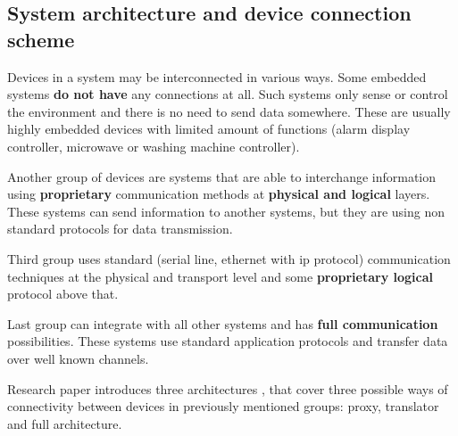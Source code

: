 \subsection{System architecture and  device connection scheme}
\label{sec:device_connection_scheme}
Devices in a system may be interconnected in various ways.
Some embedded systems \textbf{do not have} any connections at all. 
Such systems only sense or control the environment and there is no need to
send data somewhere. These are usually highly embedded devices with limited
amount of functions (alarm display controller, microwave or washing machine
controller).

Another group of devices are systems that are able to interchange
information using \textbf{proprietary} communication methods at \textbf{physical
and logical} layers. These systems can send information to another systems, but
they are using non standard protocols for data transmission.

Third group uses standard (serial line, ethernet with ip protocol)
communication techniques at the physical and transport level and some \textbf{proprietary
logical} protocol above that.

Last group can integrate with all other systems and has \textbf{full
communication} possibilities. These systems use standard application protocols
and transfer data over well known channels.

Research paper \cite{lws_milanovic.pdf} introduces three architectures , that
cover three possible ways of connectivity between devices in previously 
mentioned groups: proxy, translator and full architecture.



